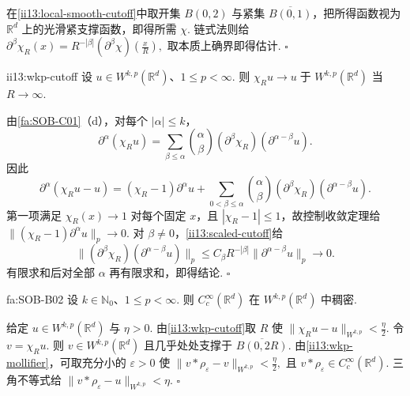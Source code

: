 \begin{FAProof}
在\autoref{ii13:local-smooth-cutoff}中取开集 \(\displaystyle B(0,2)\) 与紧集 \(\displaystyle\overline{B(0,1)}\)，把所得函数视为 \(\displaystyle\mathbb R^d\) 上的光滑紧支撑函数，即得所需 \(\displaystyle\chi\). 链式法则给 \(\displaystyle \partial^\beta\chi_R(x) = R^{-|\beta|}(\partial^\beta\chi)(\frac{x}{R}),\)
取本质上确界即得估计.
\hfill\(\square\)
\end{FAProof}

\begin{FAProposition}{ii13:wkp-cutoff}
设 \(\displaystyle u\in W^{k,p}(\mathbb R^d)\)、\(\displaystyle1\leqslant p<\infty\). 则 \(\displaystyle \chi_Ru \longrightarrow u \;\text{于 }W^{k,p}(\mathbb R^d)\)
当 \(\displaystyle R\to\infty\).
\end{FAProposition}

\begin{FAProof}
由\autoref{fa:SOB-C01}（d），对每个 \(\displaystyle|\alpha|\leqslant k\)，
\[
\partial^\alpha(\chi_Ru)
=
\sum_{\beta\leqslant\alpha}
\binom{\alpha}{\beta}
(\partial^\beta\chi_R)
(\partial^{\alpha-\beta}u).
\]
因此
\[
\partial^\alpha(\chi_Ru-u)
=
(\chi_R-1)\partial^\alpha u
+
\sum_{0<\beta\leqslant\alpha}
\binom{\alpha}{\beta}
(\partial^\beta\chi_R)
(\partial^{\alpha-\beta}u).
\]
第一项满足 \(\displaystyle\chi_R(x)\to1\) 对每个固定 \(\displaystyle x\)，且 \(\displaystyle|\chi_R-1|\leqslant1\)，故控制收敛定理给 \(\displaystyle \|(\chi_R-1)\partial^\alpha u\|_p \longrightarrow0.\)
对 \(\displaystyle\beta\neq0\)，\autoref{ii13:scaled-cutoff}给
\[
\|(\partial^\beta\chi_R)(\partial^{\alpha-\beta}u)\|_p
\leqslant
C_\beta R^{-|\beta|}
\|\partial^{\alpha-\beta}u\|_p
\longrightarrow0.
\]
有限求和后对全部 \(\displaystyle\alpha\) 再有限求和，即得结论.
\hfill\(\square\)
\end{FAProof}

\begin{FATheorem}[B][全空间光滑紧支撑密度]{fa:SOB-B02}
设 \(\displaystyle k\in\mathbb N_0\)、\(\displaystyle1\leqslant p<\infty\). 则 \(\displaystyle C_c^\infty(\mathbb R^d)\) 在 \(\displaystyle W^{k,p}(\mathbb R^d)\) 中稠密.
\end{FATheorem}

\begin{FAProof}
给定 \(\displaystyle u\in W^{k,p}(\mathbb R^d)\) 与 \(\displaystyle\eta>0\). 由\autoref{ii13:wkp-cutoff}取 \(\displaystyle R\) 使 \(\displaystyle \|\chi_Ru-u\|_{W^{k,p}}<\frac\eta2.\)
令 \(\displaystyle v=\chi_Ru\). 则 \(\displaystyle v\in W^{k,p}(\mathbb R^d)\) 且几乎处处支撑于 \(\displaystyle\overline{B(0,2R)}\). 由\autoref{ii13:wkp-mollifier}，可取充分小的 \(\displaystyle\varepsilon>0\) 使 \(\displaystyle \|v*\rho_\varepsilon-v\|_{W^{k,p}}<\frac\eta2,\)
且 \(\displaystyle v*\rho_\varepsilon\in C_c^\infty(\mathbb R^d)\). 三角不等式给 \(\displaystyle\|v*\rho_\varepsilon-u\|_{W^{k,p}}<\eta\).
\hfill\(\square\)
\end{FAProof}


